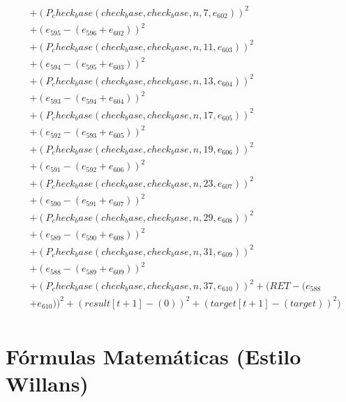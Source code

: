 \documentclass[10pt, a4paper]{article}
\begin{document}
\begin{small}
\begin{align*}
& + (P_check_base(check_base, check_base, n, 7, e_{602}))^{2} \\
& + (e_{595} - (e_{596} + e_{602}))^{2} \\
& + (P_check_base(check_base, check_base, n, 11, e_{603}))^{2} \\
& + (e_{594} - (e_{595} + e_{603}))^{2} \\
& + (P_check_base(check_base, check_base, n, 13, e_{604}))^{2} \\
& + (e_{593} - (e_{594} + e_{604}))^{2} \\
& + (P_check_base(check_base, check_base, n, 17, e_{605}))^{2} \\
& + (e_{592} - (e_{593} + e_{605}))^{2} \\
& + (P_check_base(check_base, check_base, n, 19, e_{606}))^{2} \\
& + (e_{591} - (e_{592} + e_{606}))^{2} \\
& + (P_check_base(check_base, check_base, n, 23, e_{607}))^{2} \\
& + (e_{590} - (e_{591} + e_{607}))^{2} \\
& + (P_check_base(check_base, check_base, n, 29, e_{608}))^{2} \\
& + (e_{589} - (e_{590} + e_{608}))^{2} \\
& + (P_check_base(check_base, check_base, n, 31, e_{609}))^{2} \\
& + (e_{588} - (e_{589} + e_{609}))^{2} \\
& + (P_check_base(check_base, check_base, n, 37, e_{610}))^{2} + (RET - (e_{588} \\
& + e_{610}))^{2} + (result[t+1] - (0))^{2} + (target[t+1] - (target))^{2}) \\
\end{align*}
\end{small}\part{Fórmulas Matemáticas (Estilo Willans)}
\end{document}
